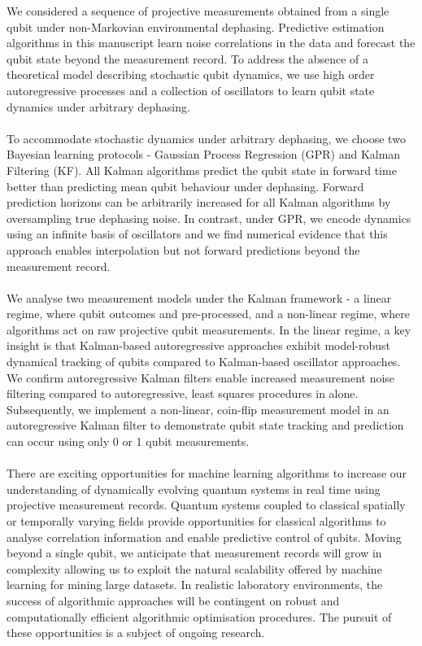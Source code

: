 \documentclass[pra, reprint]{revtex4-1}
\begin{document}
We considered a sequence of projective measurements obtained from a single qubit under non-Markovian environmental dephasing. Predictive estimation algorithms in this manuscript learn noise correlations in the data and forecast the qubit state beyond the measurement record. To address the absence of a theoretical model describing stochastic qubit dynamics, we use high order autoregressive processes and a collection of oscillators to learn qubit state dynamics under arbitrary dephasing. 
\\
\\
To accommodate stochastic dynamics under arbitrary dephasing, we choose two Bayesian learning protocols - Gaussian Process Regression (GPR) and Kalman Filtering (KF).  All Kalman algorithms predict the qubit state in forward time better than predicting mean qubit behaviour under dephasing.  Forward prediction horizons can be arbitrarily increased for all Kalman algorithms by oversampling true dephasing noise.  In contrast, under GPR, we encode dynamics using an infinite basis of oscillators and we find numerical evidence that this approach enables interpolation but not forward predictions beyond the measurement record.  
\\
\\
We analyse two measurement models under the Kalman framework - a linear regime, where qubit outcomes and pre-processed, and a non-linear regime, where algorithms act on raw projective qubit measurements. In the linear regime, a key insight is that Kalman-based autoregressive approaches exhibit model-robust dynamical tracking of qubits compared to Kalman-based oscillator approaches. We confirm autoregressive Kalman filters enable increased measurement noise filtering compared to autoregressive, least squares procedures in \cite{mavadia2017} alone. Subsequently, we implement a non-linear, coin-flip measurement model in an autoregressive Kalman filter to demonstrate qubit state tracking and prediction can occur using only 0 or 1 qubit measurements. 
\\
\\
There are exciting opportunities for machine learning algorithms to increase our understanding of dynamically evolving quantum systems in real time using  projective measurement records. Quantum systems coupled to classical spatially or temporally varying fields provide opportunities for classical algorithms to analyse correlation information and enable predictive control of qubits. Moving beyond a single qubit, we anticipate that measurement records will grow in complexity allowing us to exploit the natural scalability offered by machine learning for mining large datasets. In realistic laboratory environments, the success of algorithmic approaches will be contingent on robust and computationally efficient algorithmic optimisation procedures. The pursuit of these opportunities is a subject of ongoing research.
\end{document}
